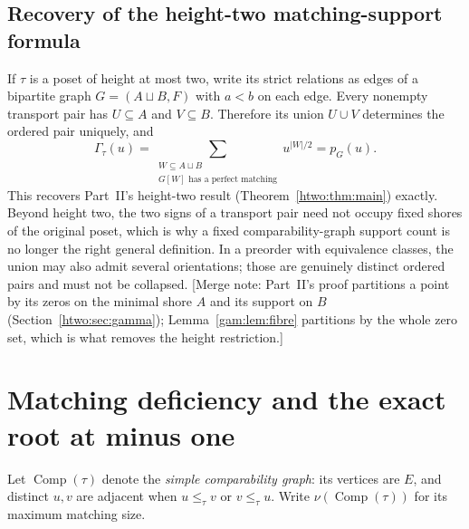 \documentclass[11pt]{article}
\numberwithin{equation}{section}
\theoremstyle{definition}
\newcommand{\Comp}{\operatorname{Comp}}
\begin{document}
\subsection{Recovery of the height-two matching-support formula}
\label{gam:sec:heighttwo}
If $\tau$ is a poset of height at most two, write its strict relations as
edges of a bipartite graph $G=(A\sqcup B,F)$ with $a<b$ on each edge.
Every nonempty transport pair has $U\subseteq A$ and $V\subseteq B$.
Therefore its union $U\cup V$ determines the ordered pair uniquely, and
\[
 \Gamma_\tau(u)=\sum_{\substack{W\subseteq A\sqcup B\\
                                  G[W]\text{ has a perfect matching}}}
                         u^{|W|/2}=p_G(u).
\]
This recovers Part~II's height-two result (Theorem~\ref{htwo:thm:main})
exactly. Beyond height two, the two signs of a transport pair need not
occupy fixed shores of the original poset, which is why a fixed
comparability-graph support count is no longer the right general
definition. In a preorder with equivalence classes, the union may also admit
several orientations; those are genuinely distinct ordered pairs and must
not be collapsed. [Merge note: Part~II's proof partitions a point by its
zeros on the minimal shore $A$ and its support on $B$
(Section~\ref{htwo:sec:gamma}); Lemma~\ref{gam:lem:fibre} partitions by
the whole zero set, which is what removes the height restriction.]

\section{Matching deficiency and the exact root at minus one}\label{gam:sec:deficiency}
Let $\Comp(\tau)$ denote the \emph{simple comparability graph}: its vertices
are $E$, and distinct $u,v$ are adjacent when $u\le_\tau v$ or
$v\le_\tau u$. Write $\nu(\Comp(\tau))$ for its maximum matching size.
\end{document}
